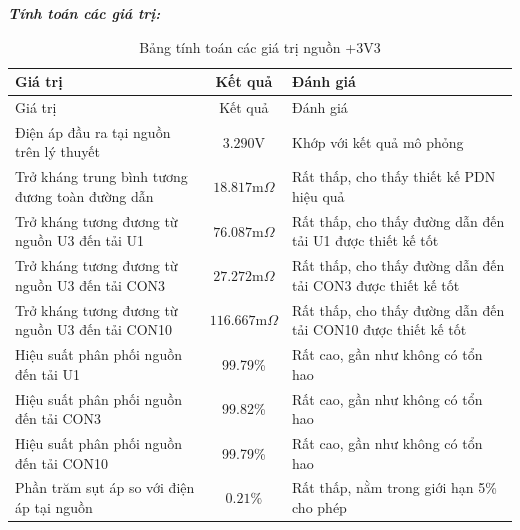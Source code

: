             \textbf{\textit{Tính toán các giá trị:}}
            \begin{longtable}{|p{}|c|p{}|}           
                \caption{Bảng tính toán các giá trị nguồn +3V3}\\
                \hline
                Giá trị & Kết quả & Đánh giá \\
                \hline
                \endfirsthead
                
                \hline
                Giá trị & Kết quả & Đánh giá \\
                \hline
                \endhead
                
                \hline
                \endfoot
                
                \hline
                \endlastfoot
                
                Điện áp đầu ra tại nguồn trên lý thuyết & $3.290\text{V}$ & Khớp với kết quả mô phỏng \\
                Trở kháng trung bình tương đương toàn đường dẫn & $18.817\text{m}\Omega$ & Rất thấp, cho thấy thiết kế PDN hiệu quả \\
                Trở kháng tương đương từ nguồn U3 đến tải U1 & $76.087\text{m}\Omega$ & Rất thấp, cho thấy đường dẫn đến tải U1 được thiết kế tốt \\
                Trở kháng tương đương từ nguồn U3 đến tải CON3 & $27.272\text{m}\Omega$ & Rất thấp, cho thấy đường dẫn đến tải CON3 được thiết kế tốt \\
                Trở kháng tương đương từ nguồn U3 đến tải CON10 & $116.667\text{m}\Omega$ & Rất thấp, cho thấy đường dẫn đến tải CON10 được thiết kế tốt \\
                Hiệu suất phân phối nguồn đến tải U1 & 99.79\% & Rất cao, gần như không có tổn hao \\
                Hiệu suất phân phối nguồn đến tải CON3 & 99.82\% & Rất cao, gần như không có tổn hao \\
                Hiệu suất phân phối nguồn đến tải CON10 & 99.79\% & Rất cao, gần như không có tổn hao \\
                Phần trăm sụt áp so với điện áp tại nguồn & $\mathbf{0.21\%}$ & Rất thấp, nằm trong giới hạn 5\% cho phép
                \label{tab:3v3_calculation}\\

                \hline
            \end{longtable}
            
